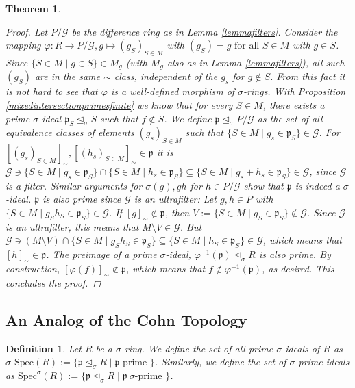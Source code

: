 \documentclass{article}
\def\p{\mathfrak{p}}
\def\s{\sigma}
\def\si{\unlhd_{\sigma}}
\def\Spec{\text{Spec}}
\def\fa{\text{ for all }}
\newenvironment{bew}{\begin{proof}[Proof]}{\end{proof}}
\theoremstyle{plain}
\newtheorem{theorem}[Satz]{Theorem}
\newtheorem{defn}[Satz]{Definition}
\theoremstyle{definition}
\begin{document}
\begin{theorem}
\begin{bew}
Let $P/\mathcal{G}$ be the difference ring as in Lemma \ref{lemmafilters}. Consider the mapping $\varphi: R \rightarrow P/\mathcal{G}, g \mapsto (g_S)_{S \in M}$ with $(g_S) = g \fa S \in M$ with $g \in S$. 
Since $\{ S \in M \mid g \in S \} \in M_g$ (with $M_g$ also as in Lemma \ref{lemmafilters}), all such $(g_S)$ are in the same $\sim$ class, independent of the $g_s$ for $g \notin S$. 
From this fact it is not hard to see that $\varphi$ is a well-defined morphism of $\s$-rings. 
With Proposition \ref{mixedintersectionprimesfinite} we know that for every $S \in M$, there exists a prime $\s$-ideal $\p_S \si S$ such that $f \notin S$. 
We define $\p \si P/\mathcal{G}$ as the set of all equivalence classes of elements $(g_s)_{S \in M}$ such that $\{ S \in M \mid g_s \in \p_S \} \in \mathcal{G}$. 
For $[(g_s)_{S \in M}]_{\sim}, [(h_s)_{S \in M}]_{\sim} \in \p$ it is $ \mathcal{G} \ni \{ S \in M \mid  g_s \in \p_S \} \cap  \{ S \in M \mid  h_s \in \p_S \} \subseteq \{ S \in M \mid  g_s + h_s \in \p_S \} \in \mathcal{G}$,
since $\mathcal{G}$ is a filter. Similar arguments for $\s(g), gh$ for $h \in P/\mathcal{G}$ show that $\p$ is indeed a $\s$-ideal. $\p$ is also prime since $\mathcal{G}$ is an ultrafilter:
Let $g,h \in P$ with $\{ S \in M \mid g_Sh_S \in \p_S \} \in \mathcal{G}$. If $[g]_\sim \notin \p$, then $V:= \{ S \in M \mid g_S \in \p_S \} \notin \mathcal{G}$. Since $\mathcal{G}$ is an ultrafilter, 
this means that $M \setminus V \in \mathcal{G}$. But $\mathcal{G} \ni (M \setminus V) \cap \{ S \in M \mid g_S h_S \in \p_S \} \subseteq \{ S \in M \mid h_S \in \p_S \} \in \mathcal{G}$, which means that $[h]_\sim \in \p$.
The preimage of a prime $\s$-ideal, $\varphi^{-1}(\p) \si R$ is also prime. By construction, $[\varphi(f)]_\sim \notin \p$, which means that $f \notin \varphi^{-1}(\p)$, as desired. This concludes the proof.

\end{bew}
\end{theorem}

\subsection{An Analog of the Cohn Topology}

\begin{defn}
Let $R$ be a $\s$-ring. We define the set of all prime $\s$-ideals of $R$ as $\s$-$\Spec(R):= \{ \p \si R \mid \p \text{ prime }\}$. Similarly, we define the set of $\s$-prime ideals as $\Spec^\s(R):= \{ \p \si R \mid \p ~ \s\text{-prime }\}$.
\end{defn}
\end{document}

